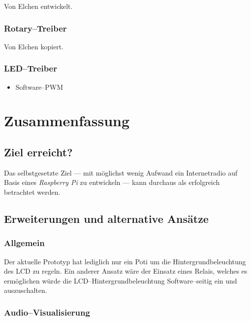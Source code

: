 \documentclass[11pt,ngerman,toc=listof,index=totoc]{scrreprt}
\providecommand{\tightlist}{%
  \setlength{\itemsep}{0pt}\setlength{\parskip}{0pt}}
\begin{document}
Von Elchen entwickelt.

\subsection{Rotary--Treiber}\label{rotarytreiber}

Von Elchen kopiert.

\subsection{LED--Treiber}\label{ledtreiber}

\begin{itemize}
\tightlist
\item
  Software--PWM
\end{itemize}

\chapter{Zusammenfassung}\label{zusammenfassung}

\section{Ziel erreicht?}\label{ziel-erreicht}

Das selbstgesetzte Ziel --- mit möglichst wenig Aufwand ein
Internetradio auf Basis eines \emph{Raspberry Pi} zu entwickeln --- kann
durchaus als erfolgreich betrachtet werden.

\section{Erweiterungen und alternative
Ansätze}\label{erweiterungen-und-alternative-ansuxe4tze}

\subsection{Allgemein}\label{allgemein}

Der aktuelle Prototyp hat lediglich nur ein Poti um die
Hintergrundbeleuchtung des LCD zu regeln. Ein anderer Ansatz wäre der
Einsatz eines Relais, welches es ermöglichen würde die
LCD--Hintergrundbeleuchtung Software--seitig ein und auszuschalten.

\subsection{Audio--Visualisierung}\label{audiovisualisierung}
\end{document}
